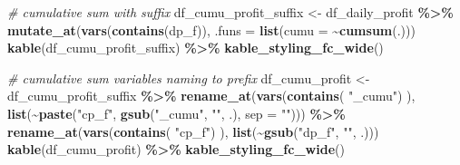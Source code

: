 \documentclass[
]{book}
\newenvironment{Shaded}{\begin{snugshade}}{\end{snugshade}}
\newcommand{\CommentTok}[1]{\textcolor[rgb]{0.56,0.35,0.01}{\textit{#1}}}
\newcommand{\DataTypeTok}[1]{\textcolor[rgb]{0.13,0.29,0.53}{#1}}
\newcommand{\KeywordTok}[1]{\textcolor[rgb]{0.13,0.29,0.53}{\textbf{#1}}}
\newcommand{\NormalTok}[1]{#1}
\newcommand{\OperatorTok}[1]{\textcolor[rgb]{0.81,0.36,0.00}{\textbf{#1}}}
\newcommand{\StringTok}[1]{\textcolor[rgb]{0.31,0.60,0.02}{#1}}
\begin{document}
\begin{Shaded}
\begin{Highlighting}[]
\CommentTok{\# cumulative sum with suffix}
\NormalTok{df\_cumu\_profit\_suffix \textless{}{-}}\StringTok{ }\NormalTok{df\_daily\_profit }\OperatorTok{\%\textgreater{}\%}
\StringTok{  }\KeywordTok{mutate\_at}\NormalTok{(}\KeywordTok{vars}\NormalTok{(}\KeywordTok{contains}\NormalTok{(}\StringTok{\textquotesingle{}dp\_f\textquotesingle{}}\NormalTok{)), }\DataTypeTok{.funs =} \KeywordTok{list}\NormalTok{(}\DataTypeTok{cumu =} \OperatorTok{\textasciitilde{}}\KeywordTok{cumsum}\NormalTok{(.)))}
\KeywordTok{kable}\NormalTok{(df\_cumu\_profit\_suffix) }\OperatorTok{\%\textgreater{}\%}
\StringTok{  }\KeywordTok{kable\_styling\_fc\_wide}\NormalTok{()}
\end{Highlighting}
\end{Shaded}

\begin{table}[!h]
\centering
{}
\end{table}

\begin{Shaded}
\begin{Highlighting}[]
\CommentTok{\# cumulative sum variables naming to prefix}
\NormalTok{df\_cumu\_profit \textless{}{-}}\StringTok{ }\NormalTok{df\_cumu\_profit\_suffix }\OperatorTok{\%\textgreater{}\%}
\StringTok{  }\KeywordTok{rename\_at}\NormalTok{(}\KeywordTok{vars}\NormalTok{(}\KeywordTok{contains}\NormalTok{( }\StringTok{"\_cumu"}\NormalTok{) ), }\KeywordTok{list}\NormalTok{(}\OperatorTok{\textasciitilde{}}\KeywordTok{paste}\NormalTok{(}\StringTok{"cp\_f"}\NormalTok{, }\KeywordTok{gsub}\NormalTok{(}\StringTok{"\_cumu"}\NormalTok{, }\StringTok{""}\NormalTok{, .), }\DataTypeTok{sep =} \StringTok{""}\NormalTok{))) }\OperatorTok{\%\textgreater{}\%}
\StringTok{  }\KeywordTok{rename\_at}\NormalTok{(}\KeywordTok{vars}\NormalTok{(}\KeywordTok{contains}\NormalTok{( }\StringTok{"cp\_f"}\NormalTok{) ), }\KeywordTok{list}\NormalTok{(}\OperatorTok{\textasciitilde{}}\KeywordTok{gsub}\NormalTok{(}\StringTok{"dp\_f"}\NormalTok{, }\StringTok{""}\NormalTok{, .)))}
\KeywordTok{kable}\NormalTok{(df\_cumu\_profit) }\OperatorTok{\%\textgreater{}\%}
\StringTok{  }\KeywordTok{kable\_styling\_fc\_wide}\NormalTok{()}
\end{Highlighting}
\end{Shaded}
\end{document}
